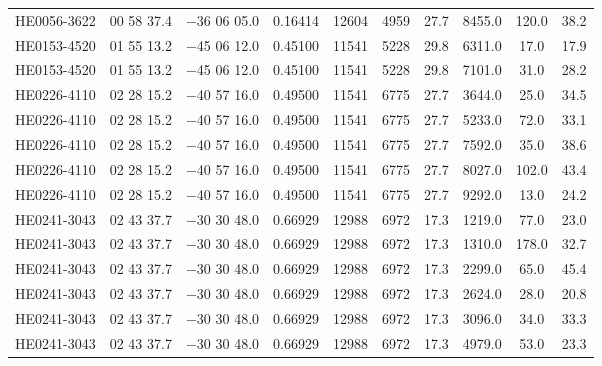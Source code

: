 \begin{landscape}
\begin{center}
\begin{longtable}{l c c c c c c c c c}
HE0056-3622  &             00 58 37.4  &         $-$36 06 05.0  &       0.16414  & 12604  &   4959  &       27.7  &      8455.0  &  120.0  &  38.2  \\
HE0153-4520  &             01 55 13.2  &         $-$45 06 12.0  &       0.45100  & 11541  &   5228  &       29.8  &      6311.0  &  17.0  &   17.9  \\
HE0153-4520  &             01 55 13.2  &         $-$45 06 12.0  &       0.45100  & 11541  &   5228  &       29.8  &      7101.0  &  31.0  &   28.2  \\
HE0226-4110  &             02 28 15.2  &         $-$40 57 16.0  &       0.49500  & 11541  &   6775  &       27.7  &      3644.0  &  25.0  &   34.5  \\
HE0226-4110  &             02 28 15.2  &         $-$40 57 16.0  &       0.49500  & 11541  &   6775  &       27.7  &      5233.0  &  72.0  &   33.1  \\
HE0226-4110  &             02 28 15.2  &         $-$40 57 16.0  &       0.49500  & 11541  &   6775  &       27.7  &      7592.0  &  35.0  &   38.6  \\
HE0226-4110  &             02 28 15.2  &         $-$40 57 16.0  &       0.49500  & 11541  &   6775  &       27.7  &      8027.0  &  102.0  &  43.4  \\
HE0226-4110  &             02 28 15.2  &         $-$40 57 16.0  &       0.49500  & 11541  &   6775  &       27.7  &      9292.0  &  13.0  &   24.2  \\
HE0241-3043  &             02 43 37.7  &         $-$30 30 48.0  &       0.66929  & 12988  &   6972  &       17.3  &      1219.0  &  77.0  &   23.0  \\
HE0241-3043  &             02 43 37.7  &         $-$30 30 48.0  &       0.66929  & 12988  &   6972  &       17.3  &      1310.0  &  178.0  &  32.7  \\
HE0241-3043  &             02 43 37.7  &         $-$30 30 48.0  &       0.66929  & 12988  &   6972  &       17.3  &      2299.0  &  65.0  &   45.4  \\
HE0241-3043  &             02 43 37.7  &         $-$30 30 48.0  &       0.66929  & 12988  &   6972  &       17.3  &      2624.0  &  28.0  &   20.8  \\
HE0241-3043  &             02 43 37.7  &         $-$30 30 48.0  &       0.66929  & 12988  &   6972  &       17.3  &      3096.0  &  34.0  &   33.3  \\
HE0241-3043  &             02 43 37.7  &         $-$30 30 48.0  &       0.66929  & 12988  &   6972  &       17.3  &      4979.0  &  53.0  &   23.3  \\

\end{longtable}
\end{center}
\end{landscape}
